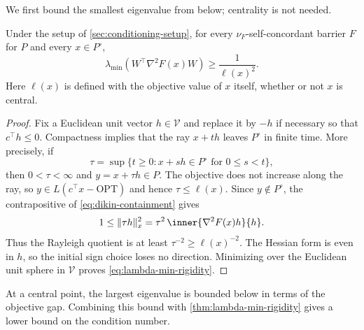 We first bound the smallest eigenvalue from below; centrality is not needed.

\begin{theorem}
\label{thm:lambda-min-rigidity}
Under the setup of \cref{sec:conditioning-setup}, for every
$\nu_F$-self-concordant barrier $F$ for $P$ and every $x\in P^\circ$,
\begin{equation}
 \lambda_{\min}\!\left(W^\top\nabla^2F(x)W\right)
 \geq \frac1{\ell(x)^2}.
 \label{eq:lambda-min-rigidity}
\end{equation}
Here $\ell(x)$ is defined with the objective value of $x$ itself, whether
or not $x$ is central.
\end{theorem}

\begin{proof}
Fix a Euclidean unit vector $h\in\mathcal V$ and replace it by $-h$ if
necessary so that $c^\top h\leq0$.  Compactness implies that the ray
$x+th$ leaves $P^\circ$ in finite time.  More precisely, if
\[
 \tau=\sup\{t\geq0:x+sh\in P^\circ\text{ for }0\leq s<t\},
\]
then $0<\tau<\infty$ and $y=x+\tau h\in P$.  The objective does not
increase along the ray, so $y\in L(c^\top x-\mathrm{OPT})$ and hence
$\tau\leq\ell(x)$.  Since $y\notin P^\circ$, the contrapositive of
\eqref{eq:dikin-containment} gives
\[
 1\leq\norm{\tau h}_x^2
   =\tau^2\,\inner{\nabla^2F(x)h}{h}.
\]
Thus the Rayleigh quotient is at least
$\tau^{-2}\geq\ell(x)^{-2}$.  The Hessian form is even in $h$, so the
initial sign choice loses no direction.  Minimizing over the Euclidean unit
sphere in $\mathcal V$ proves \eqref{eq:lambda-min-rigidity}.
\end{proof}

At a central point, the largest eigenvalue is bounded below in terms of the
objective gap.  Combining this bound with \cref{thm:lambda-min-rigidity} gives
a lower bound on the condition number.

